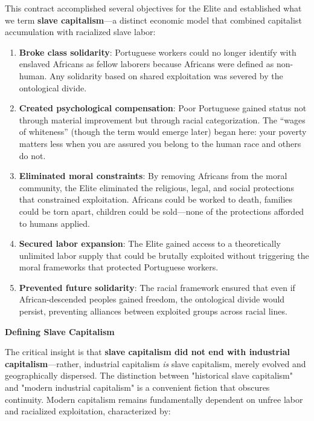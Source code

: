 \documentclass[12pt]{article}
\begin{document}
This contract accomplished several objectives for the Elite and established what we term \textbf{slave capitalism}---a distinct economic model that combined capitalist accumulation with racialized slave labor:

\begin{enumerate}
    \item \textbf{Broke class solidarity}: Portuguese workers could no longer identify with enslaved Africans as fellow laborers because Africans were defined as non-human. Any solidarity based on shared exploitation was severed by the ontological divide.
    
    \item \textbf{Created psychological compensation}: Poor Portuguese gained status not through material improvement but through racial categorization. The ``wages of whiteness'' (though the term would emerge later) began here: your poverty matters less when you are assured you belong to the human race and others do not.
    
    \item \textbf{Eliminated moral constraints}: By removing Africans from the moral community, the Elite eliminated the religious, legal, and social protections that constrained exploitation. Africans could be worked to death, families could be torn apart, children could be sold---none of the protections afforded to humans applied.
    
    \item \textbf{Secured labor expansion}: The Elite gained access to a theoretically unlimited labor supply that could be brutally exploited without triggering the moral frameworks that protected Portuguese workers.
    
    \item \textbf{Prevented future solidarity}: The racial framework ensured that even if African-descended peoples gained freedom, the ontological divide would persist, preventing alliances between exploited groups across racial lines.
\end{enumerate}

\textbf{Defining Slave Capitalism}

The critical insight is that \textbf{slave capitalism did not end with industrial capitalism}---rather, industrial capitalism \textit{is} slave capitalism, merely evolved and geographically dispersed. The distinction between "historical slave capitalism" and "modern industrial capitalism" is a convenient fiction that obscures continuity. Modern capitalism remains fundamentally dependent on unfree labor and racialized exploitation, characterized by:
\end{document}
